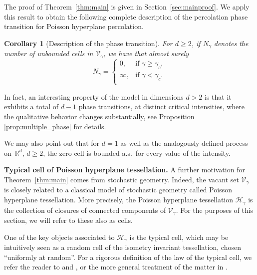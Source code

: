 \documentclass[12pt,a4paper]{article}
\newtheorem{corollary}[proposition]{Corollary}
\theoremstyle{definition}
\begin{document}
The proof of Theorem~\ref{thm:main} is given in Section~\ref{sec:mainproof}. We apply this result to obtain the following complete description of the percolation phase transition for Poisson hyperplane percolation.  

\begin{corollary}[Description of the phase transition] \label{cor:phase} For $d\ge2$, if $N_\gamma$ denotes the number of unbounded cells in $\mathcal V_\gamma$, we have that almost surely
$$
N_\gamma = \begin{cases} 0, & \text{if} \, \, \gamma \geq \gamma_c, \\ \infty, & \text{if} \, \, \gamma<\gamma_c. \\ \end{cases}
$$
\end{corollary}

In fact, an interesting property of the model in dimensions $d > 2$ is that it exhibits a total of $d-1$ phase transitions, at distinct critical intensities, where the qualitative behavior changes substantially, see Proposition \ref{prop:multiple_phase} for details.

We may also point out that for $d=1$ as well as the analogously defined process on~$\mathbb R^d$, $d\ge2$, the zero cell is bounded a.s.~for every value of the intensity. 

\medskip

{\bf\noindent Typical cell of Poisson hyperplane tessellation.} 
A further motivation for Theorem~\ref{thm:main} comes from stochastic geometry. Indeed, the vacant set $\mathcal{V}_{\gamma}$ is closely related to a classical model of stochastic geometry called Poisson hyperplane tessellation. More precisely, the Poisson hyperplane tessellation $\mathcal{H}_{\gamma}$ is the collection of closures of connected components of $\mathcal{V}_{\gamma}$. For the purposes of this section, we will refer to these also as cells. 

One of the key objects associated to $\mathcal{H}_{\gamma}$ is the typical cell, which may be intuitively seen as a random cell of the isometry invariant tessellation, chosen ``uniformly at random''.
For a rigorous definition of the law of the typical cell, we refer the reader to \cite[Theorem~2.1]{HLS24} and \cite[Section~5.4]{Herold2021}, or the more general treatment of the matter in \cite[Section 8]{Last10}.
\end{document}
